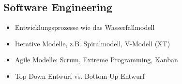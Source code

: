 \subsection{Software Engineering}
\label{sec:SoftwareEngineering}

\begin{itemize}
	\item Entwicklungsprozesse wie das Wasserfallmodell
	\item Iterative Modelle, z.B. Spiralmodell, V-Modell (XT)
	\item Agile Modelle: Scrum, Extreme Programming, Kanban
	\item Top-Down-Entwurf vs. Bottom-Up-Entwurf
\end{itemize}